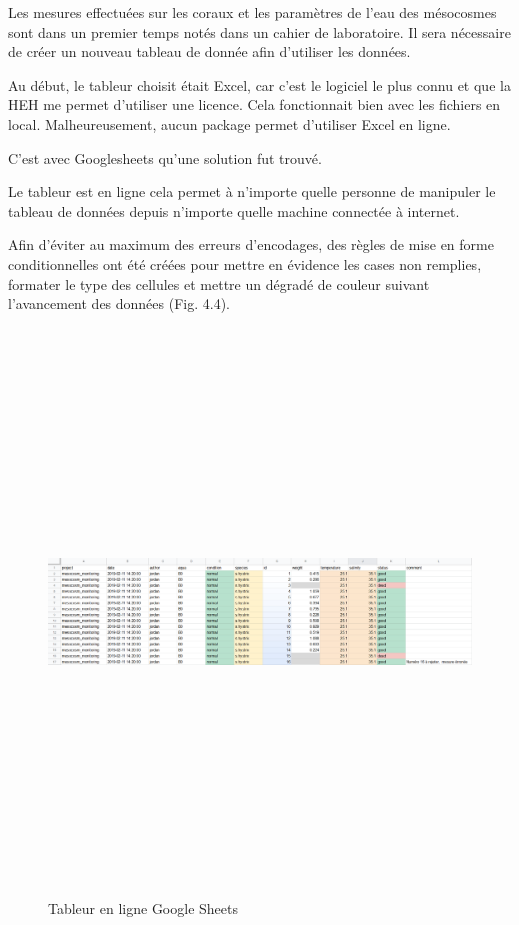 \documentclass[]{report}
\begin{document}
Les mesures effectuées sur les coraux et les paramètres de l'eau des
mésocosmes sont dans un premier temps notés dans un cahier de
laboratoire. Il sera nécessaire de créer un nouveau tableau de donnée
afin d'utiliser les données.

Au début, le tableur choisit était Excel, car c'est le logiciel le plus
connu et que la HEH me permet d'utiliser une licence. Cela fonctionnait
bien avec les fichiers en local. Malheureusement, aucun package permet
d'utiliser Excel en ligne.

C'est avec Googlesheets qu'une solution fut trouvé.

Le tableur est en ligne cela permet à n'importe quelle personne de
manipuler le tableau de données depuis n'importe quelle machine
connectée à internet.

Afin d'éviter au maximum des erreurs d'encodages, des règles de mise en
forme conditionnelles ont été créées pour mettre en évidence les cases
non remplies, formater le type des cellules et mettre un dégradé de
couleur suivant l'avancement des données (Fig. 4.4).

\begin{figure}[h!]
\includegraphics[width=18cm, height=15cm]{../image/tableur-gs.PNG}
\caption{Tableur en ligne Google Sheets}
\end{figure}
\end{document}
